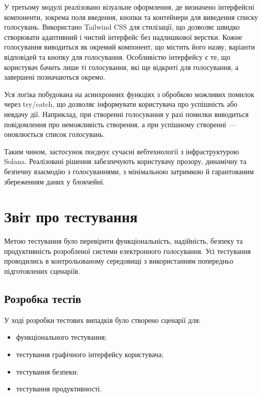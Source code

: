 \documentclass[14pt]{extreport}
\begin{document}
  У третьому модулі реалізовано візуальне оформлення, де визначено інтерфейсні компоненти, зокрема поля введення, кнопки та контейнери для виведення списку голосувань. Використано Tailwind CSS для стилізації, що дозволяє швидко створювати адаптивний і чистий інтерфейс без надлишкової верстки. Кожне голосування виводиться як окремий компонент, що містить його назву, варіанти відповідей та кнопку для голосування. Особливістю інтерфейсу є те, що користувач бачить лише ті голосування, які ще відкриті для голосування, а завершені позначаються окремо.

  Уся логіка побудована на асинхронних функціях з обробкою можливих помилок через try/catch, що дозволяє інформувати користувача про успішність або невдачу дії. Наприклад, при створенні голосування у разі помилки виводиться повідомлення про неможливість створення, а при успішному створенні — оновлюється список голосувань.

  Таким чином, застосунок поєднує сучасні вебтехнології з інфраструктурою Solana. Реалізовані рішення забезпечують користувачу прозору, динамічну та безпечну взаємодію з голосуваннями, з мінімальною затримкою й гарантованим збереженням даних у блокчейні.
    
  \section{Звіт про тестування}
  
  Метою тестування було перевірити функціональність, надійність, безпеку та продуктивність розробленої системи електронного голосування. Усі тестування проводились в контрольованому середовищі з використанням попередньо підготовлених сценаріїв.
  
  \subsection{Розробка тестів}
  
  У ході розробки тестових випадків було створено сценарії для:
  
  \begin{itemize}
    \item функціонального тестування;
    \item тестування графічного інтерфейсу користувача;
    \item тестування безпеки;
    \item тестування продуктивності.
  \end{itemize}
  
\end{document}
